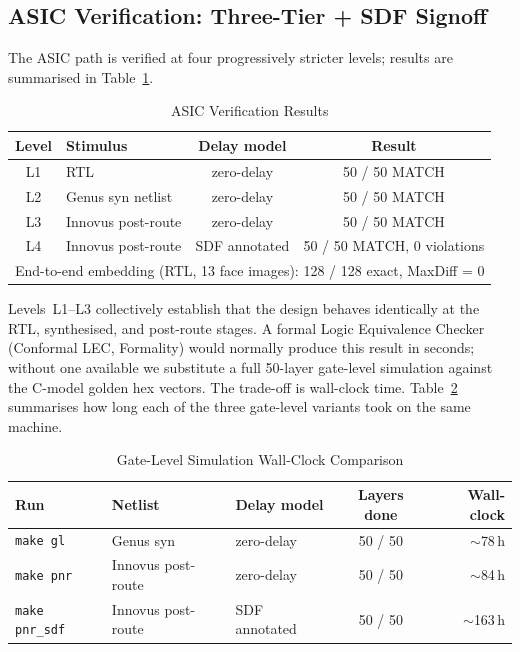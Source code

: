 \subsection{ASIC Verification: Three-Tier + SDF Signoff}
\label{sec:verify:asic}

The ASIC path is verified at four progressively stricter levels; results are summarised in Table~\ref{tab:asic_verify_results}.

\begin{table}[H]
\centering
\caption{ASIC Verification Results}
\label{tab:asic_verify_results}
\begin{tabular}{clcc}
\toprule
\textbf{Level} & \textbf{Stimulus} & \textbf{Delay model} & \textbf{Result} \\
\midrule
L1 & RTL                & zero-delay & 50 / 50 MATCH \\
L2 & Genus syn netlist  & zero-delay & 50 / 50 MATCH \\
L3 & Innovus post-route & zero-delay & 50 / 50 MATCH \\
L4 & Innovus post-route & SDF annotated & 50 / 50 MATCH, 0 violations \\
\midrule
\multicolumn{4}{l}{End-to-end embedding (RTL, 13 face images): 128 / 128 exact, MaxDiff = 0} \\
\bottomrule
\end{tabular}
\end{table}

Levels~L1--L3 collectively establish that the design behaves identically at the RTL, synthesised, and post-route stages. A formal Logic Equivalence Checker (Conformal LEC, Formality) would normally produce this result in seconds; without one available we substitute a full 50-layer gate-level simulation against the C-model golden hex vectors. The trade-off is wall-clock time. Table~\ref{tab:gl_runtime} summarises how long each of the three gate-level variants took on the same machine.

\begin{table}[H]
\centering
\caption{Gate-Level Simulation Wall-Clock Comparison}
\label{tab:gl_runtime}
\begin{tabular}{lllcr}
\toprule
\textbf{Run} & \textbf{Netlist} & \textbf{Delay model} & \textbf{Layers done} & \textbf{Wall-clock} \\
\midrule
\texttt{make gl}      & Genus syn         & zero-delay      & 50 / 50 & $\sim$78\,h \\
\texttt{make pnr}     & Innovus post-route & zero-delay     & 50 / 50 & $\sim$84\,h \\
\texttt{make pnr\_sdf} & Innovus post-route & SDF annotated & 50 / 50 & $\sim$163\,h \\
\bottomrule
\end{tabular}
\end{table}

